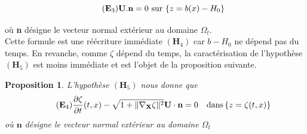 \documentclass[12pt,a4paper]{article}
\newtheorem{prop}[dfn]{\textbf{Proposition}}
\numberwithin{equation}{section}
\begin{document}
\begin{equation}
    \tag{${\textbf{E}}_3$} \label{eq_E2}
    \textbf{U}.\textbf{n} = 0 \text{  sur }\{z = b(x)-H_0\}
\end{equation} 

où \textbf{n} désigne le vecteur normal extérieur au domaine $\Omega_t$.\\

Cette formule est une réécriture immédiate $(\textbf{H}_4)$  car $b-H_0$ ne dépend pas du temps. En revanche, comme $\zeta$ dépend du temps, la caractérisation de l'hypothèse $(\textbf{H}_5)$ est moins immédiate et est l'objet de la proposition suivante.



\begin{prop} L'hypothèse $(\textbf{H}_5)$ nous donne que
    \begin{equation} \tag{$\textbf{E}_4$} \label{eq_E3}
        \frac{\partial \zeta}{\partial t}(t,x) - \sqrt{1+ \| \nabla_\textbf{X}\zeta\|^2} \textbf{U} \cdot \textbf{n} = 0 \quad\text{dans}\,\{z = \zeta(t,x)\}
    \end{equation}
    où $\textbf{n}$ désigne le vecteur normal extérieur au domaine $\Omega_t$
\end{prop}
\end{document}

